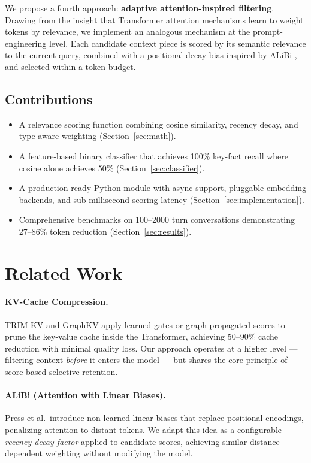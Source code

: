 \documentclass[11pt,a4paper]{article}
\begin{document}
We propose a fourth approach: \textbf{adaptive attention-inspired filtering}.
Drawing from the insight that Transformer attention mechanisms learn to weight
tokens by relevance, we implement an analogous mechanism at the prompt-engineering
level. Each candidate context piece is scored by its semantic relevance to the
current query, combined with a positional decay bias inspired by ALiBi
\cite{press2022alibi}, and selected within a token budget.

\subsection{Contributions}

\begin{itemize}
    \item A relevance scoring function combining cosine similarity, recency decay,
    and type-aware weighting (Section~\ref{sec:math}).
    \item A feature-based binary classifier that achieves 100\% key-fact recall
    where cosine alone achieves 50\% (Section~\ref{sec:classifier}).
    \item A production-ready Python module with async support, pluggable embedding
    backends, and sub-millisecond scoring latency (Section~\ref{sec:implementation}).
    \item Comprehensive benchmarks on 100--2000 turn conversations demonstrating
    27--86\% token reduction (Section~\ref{sec:results}).
\end{itemize}

\section{Related Work}
\label{sec:related}

\paragraph{KV-Cache Compression.}
TRIM-KV and GraphKV apply learned gates or graph-propagated scores to prune the
key-value cache inside the Transformer, achieving 50--90\% cache reduction with
minimal quality loss. Our approach operates at a higher level --- filtering context
\emph{before} it enters the model --- but shares the core principle of
score-based selective retention.

\paragraph{ALiBi (Attention with Linear Biases).}
Press et al.\ introduce non-learned linear biases that replace positional
encodings, penalizing attention to distant tokens. We adapt this idea as a
configurable \emph{recency decay factor} applied to candidate scores, achieving
similar distance-dependent weighting without modifying the model.
\end{document}
